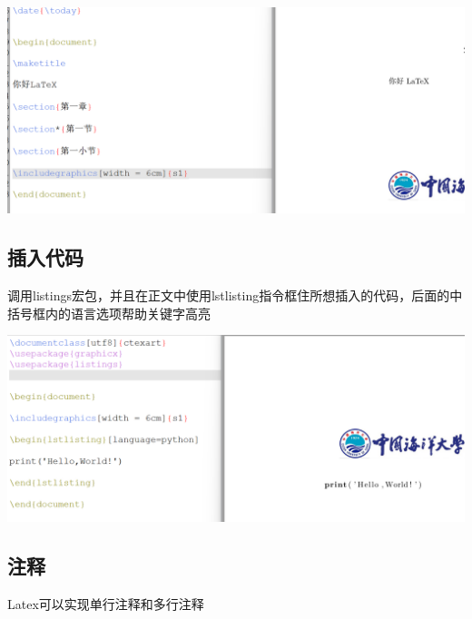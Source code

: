 \documentclass[UTF8,a4paper]{ctexart}
\begin{document}
\begin{sloppypar}
	\includegraphics[width = 16cm]{16}
	
	\subsection{插入代码}
	调用listings宏包，并且在正文中使用lstlisting指令框住所想插入的代码，后面的中括号框内的语言选项帮助关键字高亮
	
	\includegraphics[width = 16cm]{17}
	
	\subsection{注释}
	Latex可以实现单行注释和多行注释
	

\end{sloppypar}
\end{document}
